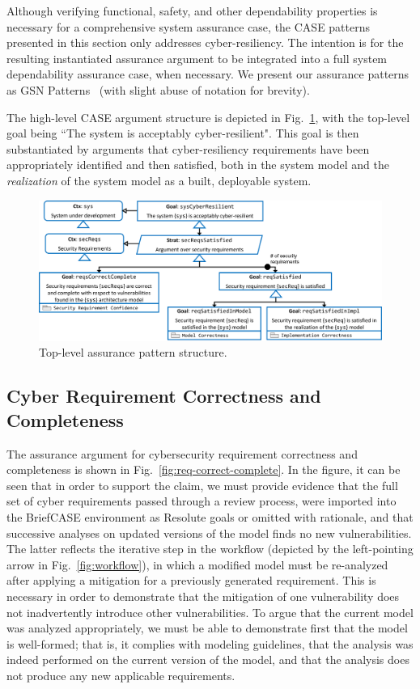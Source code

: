 Although verifying functional, safety, and other dependability properties is necessary for a comprehensive system assurance case, the CASE patterns presented in this section only addresses cyber-resiliency.  The intention is for the resulting instantiated assurance argument to be integrated into a full system dependability assurance case, when necessary.  We present our assurance patterns as GSN Patterns~\cite{Kelly97:patterns} (with slight abuse of notation for brevity).

The high-level CASE argument structure is depicted in Fig.~\ref{fig:top-level},
with the top-level goal being ``The system is acceptably cyber-resilient".  
This goal is then substantiated by arguments that cyber-resiliency requirements have been appropriately identified and then satisfied, both in the system model and the \textit{realization} of the system model as a built, deployable system.

\begin{figure}[h] 
	\centering 
	\includegraphics[width=\textwidth]{figs/top-level.png}
	\caption{Top-level assurance pattern structure.}
	\label{fig:top-level} 
\end{figure}

\subsection{Cyber Requirement Correctness and Completeness}

The assurance argument for cybersecurity requirement correctness and completeness is shown in Fig.~\ref{fig:req-correct-complete}.  
In the figure, it can be seen that in order to support the claim, we must provide evidence that the full set of cyber requirements passed through a review process, were imported into the BriefCASE environment as Resolute goals or omitted with rationale, and that successive analyses on updated versions of the model finds no new vulnerabilities.  The latter reflects the iterative step in the workflow (depicted by the left-pointing arrow in Fig.~\ref{fig:workflow}), in which a modified model must be re-analyzed after applying a mitigation for a previously generated requirement.  This is necessary in order to demonstrate that the mitigation of one vulnerability does not inadvertently introduce other vulnerabilities.  To argue that the current model was analyzed appropriately, we must be able to demonstrate first that the model is well-formed; that is, it complies with modeling guidelines, that the analysis was indeed performed on the current version of the model, and that the analysis does not produce any new applicable requirements.

